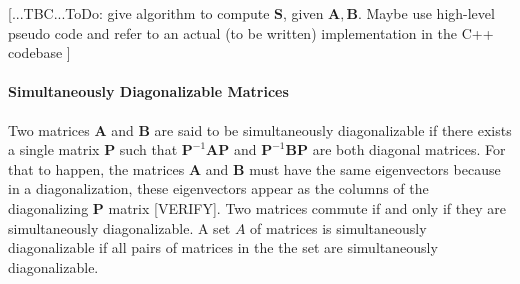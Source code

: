 [...TBC...ToDo: give algorithm to compute $\mathbf{S}$, given $\mathbf{A,B}$. Maybe use high-level pseudo code and refer to an actual (to be written) implementation in the C++ codebase ]










\paragraph{Simultaneously Diagonalizable Matrices}
Two matrices $\mathbf{A}$ and $\mathbf{B}$ are said to be simultaneously diagonalizable if there exists a single matrix $\mathbf{P}$ such that $\mathbf{P}^{-1} \mathbf{A} \mathbf{P}$ and  $\mathbf{P}^{-1} \mathbf{B} \mathbf{P}$ are both diagonal matrices. For that to happen, the matrices $\mathbf{A}$ and $\mathbf{B}$ must have the same eigenvectors because in a diagonalization, these eigenvectors appear as the columns of the diagonalizing $\mathbf{P}$ matrix [VERIFY]. Two matrices commute if and only if they are simultaneously diagonalizable. A set $A$ of matrices is simultaneously diagonalizable if all pairs of matrices in the the set are simultaneously diagonalizable.  



